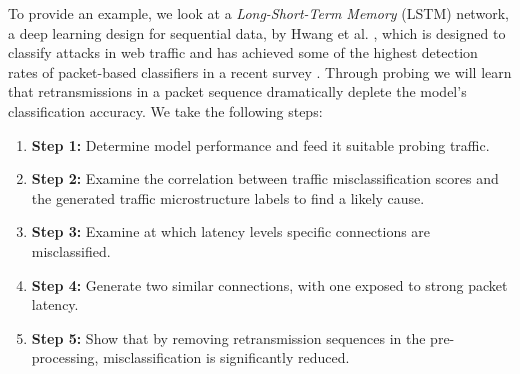 To provide an example, we look at a \textit{Long-Short-Term Memory} (LSTM) network, a deep learning design for sequential data, by Hwang et al. \cite{hwang2019lstm}, which is designed to classify attacks in web traffic and has achieved some of the highest detection rates of packet-based classifiers in a recent survey \cite{tahaei2020rise}. Through probing we will learn that retransmissions in a packet sequence dramatically deplete the model's classification accuracy. We take the following steps:

\begin{enumerate}
\item [] \textbf{Step 1:} Determine model performance and feed it suitable probing traffic.
\item [] \textbf{Step 2:} Examine the correlation between traffic misclassification scores and the generated traffic microstructure labels to find a likely cause.%
\item [] \textbf{Step 3:} Examine at which latency levels specific connections are misclassified.

\item [] \textbf{Step 4:} Generate two similar connections, with one exposed to strong packet latency.%
\item [] \textbf{Step 5:} Show that by removing retransmission sequences in the pre-processing, misclassification is significantly reduced.
\end{enumerate}









